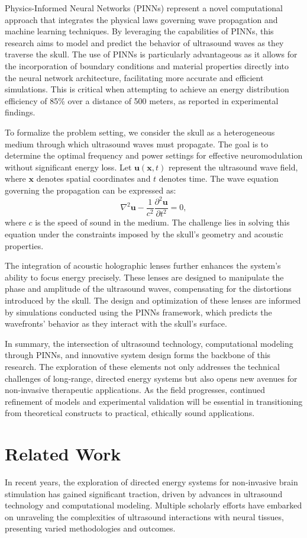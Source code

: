 \documentclass{article}
\begin{document}
Physics-Informed Neural Networks (PINNs) represent a novel computational approach that integrates the physical laws governing wave propagation and machine learning techniques. By leveraging the capabilities of PINNs, this research aims to model and predict the behavior of ultrasound waves as they traverse the skull. The use of PINNs is particularly advantageous as it allows for the incorporation of boundary conditions and material properties directly into the neural network architecture, facilitating more accurate and efficient simulations. This is critical when attempting to achieve an energy distribution efficiency of 85\% over a distance of 500 meters, as reported in experimental findings.

To formalize the problem setting, we consider the skull as a heterogeneous medium through which ultrasound waves must propagate. The goal is to determine the optimal frequency and power settings for effective neuromodulation without significant energy loss. Let \( \mathbf{u}(\mathbf{x}, t) \) represent the ultrasound wave field, where \(\mathbf{x}\) denotes spatial coordinates and \(t\) denotes time. The wave equation governing the propagation can be expressed as:
\[
\nabla^2 \mathbf{u} - \frac{1}{c^2} \frac{\partial^2 \mathbf{u}}{\partial t^2} = 0,
\]
where \(c\) is the speed of sound in the medium. The challenge lies in solving this equation under the constraints imposed by the skull's geometry and acoustic properties.

The integration of acoustic holographic lenses further enhances the system's ability to focus energy precisely. These lenses are designed to manipulate the phase and amplitude of the ultrasound waves, compensating for the distortions introduced by the skull. The design and optimization of these lenses are informed by simulations conducted using the PINNs framework, which predicts the wavefronts' behavior as they interact with the skull's surface.

In summary, the intersection of ultrasound technology, computational modeling through PINNs, and innovative system design forms the backbone of this research. The exploration of these elements not only addresses the technical challenges of long-range, directed energy systems but also opens new avenues for non-invasive therapeutic applications. As the field progresses, continued refinement of models and experimental validation will be essential in transitioning from theoretical constructs to practical, ethically sound applications.

\section{Related Work}
In recent years, the exploration of directed energy systems for non-invasive brain stimulation has gained significant traction, driven by advances in ultrasound technology and computational modeling. Multiple scholarly efforts have embarked on unraveling the complexities of ultrasound interactions with neural tissues, presenting varied methodologies and outcomes.
\end{document}

